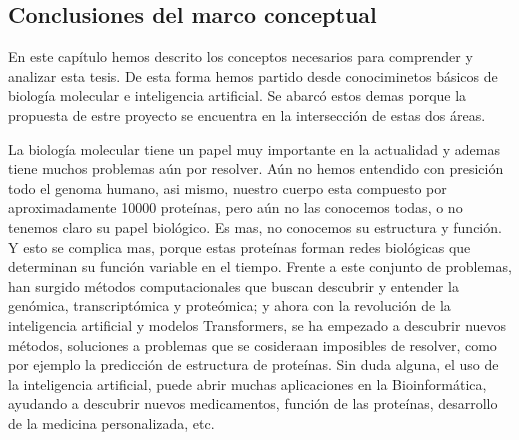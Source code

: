 \subsection{Conclusiones del marco conceptual}

En este capítulo hemos descrito los conceptos necesarios para comprender y analizar esta tesis. De esta forma hemos partido desde conociminetos básicos de biología molecular e inteligencia artificial. Se abarcó estos demas porque la propuesta de estre proyecto se encuentra en la intersección de estas dos áreas.

La biología molecular  tiene un papel muy importante en la actualidad y ademas tiene muchos problemas aún por resolver. Aún no hemos entendido con presición todo el genoma humano, asi mismo, nuestro cuerpo esta compuesto por aproximadamente 10000 proteínas, pero aún no las conocemos todas, o no tenemos claro su papel biológico. Es mas, no conocemos su estructura y función. Y esto se complica mas, porque estas proteínas forman redes biológicas que determinan su función variable en el tiempo. Frente a este conjunto de problemas, han surgido métodos computacionales que buscan descubrir y entender la genómica, transcriptómica y proteómica; y ahora con la revolución de la inteligencia artificial y modelos Transformers, se ha empezado a descubrir nuevos métodos, soluciones a problemas que se cosideraan imposibles de resolver, como por ejemplo la predicción de estructura de proteínas. Sin duda alguna, el uso de la inteligencia artificial, puede abrir muchas aplicaciones en la Bioinformática, ayudando a descubrir nuevos medicamentos, función de las proteínas, desarrollo de la medicina personalizada, etc.


